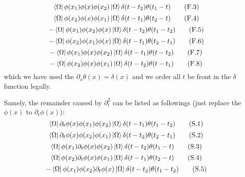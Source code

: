 \documentclass[12pt,openany]{book}
\begin{document}
	\begin{equation}
		\bra{\Omega}\phi(x_1)\phi(x)\phi(x_2)\ket{\Omega}\delta(t-t_2)\theta(t_1-t) \tag{F.3}
	\end{equation}
	\begin{equation}
		\bra{\Omega}\phi(x_2)\phi(x)\phi(x_1)\ket{\Omega}\delta(t-t_1)\theta(t_2-t) \tag{F.4}
	\end{equation}
	\begin{equation}
		-\bra{\Omega}\phi(x_1)\phi(x_2)\phi(x)\ket{\Omega}\delta(t-t_2)\theta(t_1-t_2) \tag{F.5}
	\end{equation}
	\begin{equation}
		-\bra{\Omega}\phi(x_2)\phi(x_1)\phi(x)\ket{\Omega}\delta(t-t_1)\theta(t_2-t_1) \tag{F.6}
	\end{equation}
	\begin{equation}
		-\bra{\Omega}\phi(x_1)\phi(x)\phi(x_2)\ket{\Omega}\delta(t-t_1)\theta(t-t_2) \tag{F.7}
	\end{equation}
	\begin{equation}
		-\bra{\Omega}\phi(x_2)\phi(x)\phi(x_1)\ket{\Omega}\delta(t-t_2)\theta(t-t_1) \tag{F.8}
	\end{equation}
	which we have used the $\partial_x\theta(x)=\delta(x)$ and we order all $t$ be front in the $\delta$ function legally.
	\par 
	Samely, the remainder caused by $\partial_t^2$ can be listed as followings (just replace the $\phi(x)$ to $\partial_t\phi(x)$):
   	\begin{equation}
   	\bra{\Omega}\partial_t\phi(x)\phi(x_1)\phi(x_2)\ket{\Omega}\delta(t-t_1)\theta(t_1-t_2) \tag{S.1}
   \end{equation}
   \begin{equation}
   	\bra{\Omega}\partial_t\phi(x)\phi(x_2)\phi(x_1)\ket{\Omega}\delta(t-t_2)\theta(t_2-t_1) \tag{S.2}
   \end{equation}
   \begin{equation}
   	\bra{\Omega}\phi(x_1)\partial_t\phi(x)\phi(x_2)\ket{\Omega}\delta(t-t_2)\theta(t_1-t) \tag{S.3}
   \end{equation}
   \begin{equation}
   	\bra{\Omega}\phi(x_2)\partial_t\phi(x)\phi(x_1)\ket{\Omega}\delta(t-t_1)\theta(t_2-t) \tag{S.4}
   \end{equation}
   \begin{equation}
   	-\bra{\Omega}\phi(x_1)\phi(x_2)\partial_t\phi(x)\ket{\Omega}\delta(t-t_2)\theta(t_1-t_2) \tag{S.5}
   \end{equation}
\end{document}
